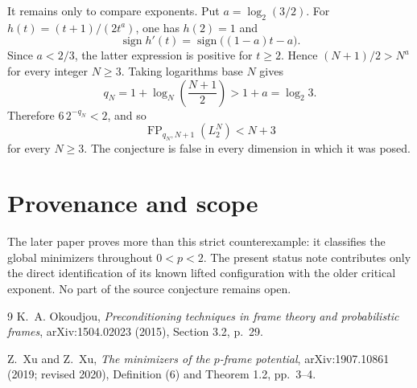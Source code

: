 \documentclass[11pt]{article}
\newcommand{\FP}{\operatorname{FP}}
\begin{document}
It remains only to compare exponents.  Put $a=\log_2(3/2)$.  For
$h(t)=(t+1)/(2t^a)$, one has $h(2)=1$ and
\[
  \operatorname{sign} h'(t)=\operatorname{sign}\bigl((1-a)t-a\bigr).
\]
Since $a<2/3$, the latter expression is positive for $t\ge2$.  Hence
$(N+1)/2>N^a$ for every integer $N\ge3$.  Taking logarithms base $N$ gives
\[
  q_N=1+\log_N\!\left(\frac{N+1}{2}\right)
      >1+a=\log_2 3.
\]
Therefore $6\,2^{-q_N}<2$, and so
\[
  \boxed{\FP_{q_N,N+1}(L_2^N)<N+3}
\]
for every $N\ge3$.  The conjecture is false in every dimension in which it
was posed.

\section*{Provenance and scope}

The later paper proves more than this strict counterexample: it classifies the
global minimizers throughout $0<p<2$.  The present status note contributes
only the direct identification of its known lifted configuration with the
older critical exponent.  No part of the source conjecture remains open.

\begin{thebibliography}{9}
K.~A. Okoudjou,
\emph{Preconditioning techniques in frame theory and probabilistic frames},
arXiv:1504.02023 (2015), Section 3.2, p.~29.

Z.~Xu and Z.~Xu,
\emph{The minimizers of the $p$-frame potential},
arXiv:1907.10861 (2019; revised 2020), Definition (6) and Theorem 1.2,
pp.~3--4.
\end{thebibliography}
\end{document}
